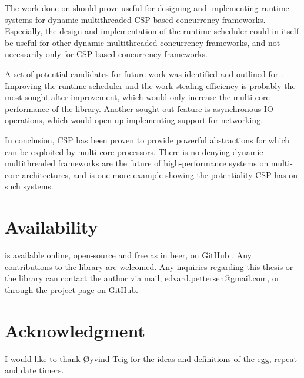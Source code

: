 The work done on \Proxc{} should prove useful for designing and implementing runtime systems for dynamic multithreaded CSP\hyp{}based concurrency frameworks. Especially, the design and implementation of the runtime scheduler could in itself be useful for other dynamic multithreaded concurrency frameworks, and not necessarily only for CSP\hyp{}based concurrency frameworks.

A set of potential candidates for future work was identified and outlined for \Proxc{}. Improving the runtime scheduler and the work stealing efficiency is probably the most sought after improvement, which would only increase the multi\hyp{}core performance of the library. Another sought out feature is asynchronous IO operations, which would open up implementing support for networking.

In conclusion, CSP has been proven to provide powerful abstractions for which can be exploited by multi\hyp{}core processors. There is no denying dynamic multithreaded frameworks are the future of high\hyp{}performance systems on multi\hyp{}core architectures, and \Proxc{} is one more example showing the potentiality CSP has on such systems.


\section{Availability}


\Proxc{} is available online, open\hyp{}source and free as in beer, on GitHub \citep{pettersen2017proxcgithub}. Any contributions to the library are welcomed. Any inquiries regarding this thesis or the library can contact the author via mail, \href{mailto:edvard.pettersen@gmail.com}{edvard.pettersen@gmail.com}, or through the project page on GitHub.


\section{Acknowledgment}


I would like to thank Øyvind Teig for the ideas and definitions of the egg, repeat and date timers.

